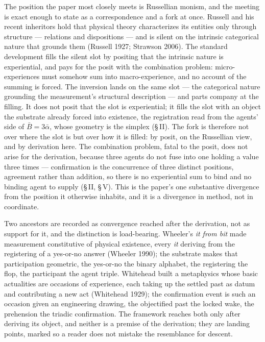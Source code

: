 \documentclass[11pt,oneside]{report}
\theoremstyle{definition}
\theoremstyle{remark}
\begin{document}
The position the paper most closely meets is Russellian monism, and the meeting is exact enough to state as a correspondence and a fork at once. Russell and his recent inheritors hold that physical theory characterizes its entities only through structure --- relations and dispositions --- and is silent on the intrinsic categorical nature that grounds them (Russell 1927; Strawson 2006). The standard development fills the silent slot by positing that the intrinsic nature is experiential, and pays for the posit with the combination problem: micro-experiences must somehow sum into macro-experience, and no account of the summing is forced. The inversion lands on the same slot --- the categorical nature grounding the measurement's structural description --- and parts company at the filling. It does not posit that the slot is experiential; it fills the slot with an object the substrate already forced into existence, the registration read from the agents' side of $\bar{B} = 3\bar{\alpha}$, whose geometry is the simplex (\S\,II). The fork is therefore not over where the slot is but over how it is filled: by posit, on the Russellian view, and by derivation here. The combination problem, fatal to the posit, does not arise for the derivation, because three agents do not fuse into one holding a value three times --- confirmation is the concurrence of three distinct positions, agreement rather than addition, so there is no experiential sum to bind and no binding agent to supply (\S\,II, \S\,V). This is the paper's one substantive divergence from the position it otherwise inhabits, and it is a divergence in method, not in coordinate.

Two ancestors are recorded as convergence reached after the derivation, not as support for it, and the distinction is load-bearing. Wheeler's \emph{it from bit} made measurement constitutive of physical existence, every \emph{it} deriving from the registering of a yes-or-no answer (Wheeler 1990); the substrate makes that participation geometric, the yes-or-no the binary alphabet, the registering the flop, the participant the agent triple. Whitehead built a metaphysics whose basic actualities are occasions of experience, each taking up the settled past as datum and contributing a new act (Whitehead 1929); the confirmation event is such an occasion given an engineering drawing, the objectified past the locked wake, the prehension the triadic confirmation. The framework reaches both only after deriving its object, and neither is a premise of the derivation; they are landing points, marked so a reader does not mistake the resemblance for descent.
\end{document}
